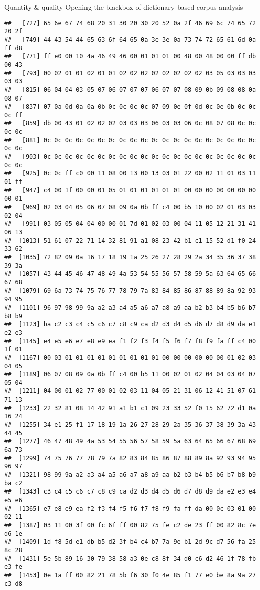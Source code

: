 \documentclass[
  ignorenonframetext,
]{beamer}
\begin{document}
\begin{frame}[fragile]{Quantity \& quality \textbar{} Opening the
blackbox of dictionary-based corpus analysis}
\begin{verbatim}
##   [727] 65 6e 67 74 68 20 31 30 20 30 20 52 0a 2f 46 69 6c 74 65 72 20 2f
##   [749] 44 43 54 44 65 63 6f 64 65 0a 3e 3e 0a 73 74 72 65 61 6d 0a ff d8
##   [771] ff e0 00 10 4a 46 49 46 00 01 01 01 00 48 00 48 00 00 ff db 00 43
##   [793] 00 02 01 01 02 01 01 02 02 02 02 02 02 02 02 03 05 03 03 03 03 03
##   [815] 06 04 04 03 05 07 06 07 07 07 06 07 07 08 09 0b 09 08 08 0a 08 07
##   [837] 07 0a 0d 0a 0a 0b 0c 0c 0c 0c 07 09 0e 0f 0d 0c 0e 0b 0c 0c 0c ff
##   [859] db 00 43 01 02 02 02 03 03 03 06 03 03 06 0c 08 07 08 0c 0c 0c 0c
##   [881] 0c 0c 0c 0c 0c 0c 0c 0c 0c 0c 0c 0c 0c 0c 0c 0c 0c 0c 0c 0c 0c 0c
##   [903] 0c 0c 0c 0c 0c 0c 0c 0c 0c 0c 0c 0c 0c 0c 0c 0c 0c 0c 0c 0c 0c 0c
##   [925] 0c 0c ff c0 00 11 08 00 13 00 13 03 01 22 00 02 11 01 03 11 01 ff
##   [947] c4 00 1f 00 00 01 05 01 01 01 01 01 01 00 00 00 00 00 00 00 00 01
##   [969] 02 03 04 05 06 07 08 09 0a 0b ff c4 00 b5 10 00 02 01 03 03 02 04
##   [991] 03 05 05 04 04 00 00 01 7d 01 02 03 00 04 11 05 12 21 31 41 06 13
##  [1013] 51 61 07 22 71 14 32 81 91 a1 08 23 42 b1 c1 15 52 d1 f0 24 33 62
##  [1035] 72 82 09 0a 16 17 18 19 1a 25 26 27 28 29 2a 34 35 36 37 38 39 3a
##  [1057] 43 44 45 46 47 48 49 4a 53 54 55 56 57 58 59 5a 63 64 65 66 67 68
##  [1079] 69 6a 73 74 75 76 77 78 79 7a 83 84 85 86 87 88 89 8a 92 93 94 95
##  [1101] 96 97 98 99 9a a2 a3 a4 a5 a6 a7 a8 a9 aa b2 b3 b4 b5 b6 b7 b8 b9
##  [1123] ba c2 c3 c4 c5 c6 c7 c8 c9 ca d2 d3 d4 d5 d6 d7 d8 d9 da e1 e2 e3
##  [1145] e4 e5 e6 e7 e8 e9 ea f1 f2 f3 f4 f5 f6 f7 f8 f9 fa ff c4 00 1f 01
##  [1167] 00 03 01 01 01 01 01 01 01 01 01 00 00 00 00 00 00 01 02 03 04 05
##  [1189] 06 07 08 09 0a 0b ff c4 00 b5 11 00 02 01 02 04 04 03 04 07 05 04
##  [1211] 04 00 01 02 77 00 01 02 03 11 04 05 21 31 06 12 41 51 07 61 71 13
##  [1233] 22 32 81 08 14 42 91 a1 b1 c1 09 23 33 52 f0 15 62 72 d1 0a 16 24
##  [1255] 34 e1 25 f1 17 18 19 1a 26 27 28 29 2a 35 36 37 38 39 3a 43 44 45
##  [1277] 46 47 48 49 4a 53 54 55 56 57 58 59 5a 63 64 65 66 67 68 69 6a 73
##  [1299] 74 75 76 77 78 79 7a 82 83 84 85 86 87 88 89 8a 92 93 94 95 96 97
##  [1321] 98 99 9a a2 a3 a4 a5 a6 a7 a8 a9 aa b2 b3 b4 b5 b6 b7 b8 b9 ba c2
##  [1343] c3 c4 c5 c6 c7 c8 c9 ca d2 d3 d4 d5 d6 d7 d8 d9 da e2 e3 e4 e5 e6
##  [1365] e7 e8 e9 ea f2 f3 f4 f5 f6 f7 f8 f9 fa ff da 00 0c 03 01 00 02 11
##  [1387] 03 11 00 3f 00 fc 6f ff 00 82 75 fe c2 de 23 ff 00 82 8c 7e d6 1e
##  [1409] 1d f8 5d e1 db b5 d2 3f b4 c4 b7 7a 9e b1 2d 9c d7 56 fa 25 8c 28
##  [1431] 5e 5b 89 16 30 79 38 58 a3 0e c8 8f 34 d0 c6 d2 46 1f 78 fb e3 fe
##  [1453] 0e 1a ff 00 82 21 78 5b f6 30 f0 4e 85 f1 77 e0 be 8a 9a 27 c3 d8

\end{verbatim}
\end{frame}
\end{document}
